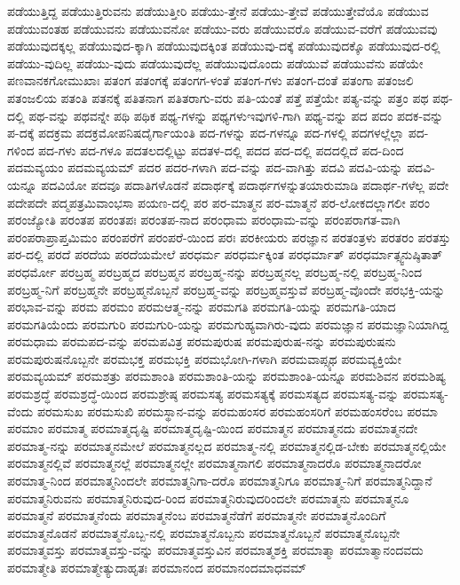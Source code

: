 {ಪಡೆಯುತ್ತಿದ್ದ
ಪಡೆಯುತ್ತಿರುವನು
ಪಡೆಯುತ್ತೀರಿ
ಪಡೆಯು-ತ್ತೇನೆ
ಪಡೆಯು-ತ್ತೇವೆ
ಪಡೆಯುತ್ತೇವೆಯೊ
ಪಡೆಯುವ
ಪಡೆಯುವಂತಹ
ಪಡೆಯುವನು
ಪಡೆಯುವನೋ
ಪಡೆಯು-ವರು
ಪಡೆಯುವರೊ
ಪಡೆಯುವ-ವರೆಗೆ
ಪಡೆಯುವವು
ಪಡೆಯುವುದಕ್ಕಲ್ಲ
ಪಡೆಯುವುದ-ಕ್ಕಾಗಿ
ಪಡೆಯುವುದಕ್ಕಿಂತ
ಪಡೆಯುವು-ದಕ್ಕೆ
ಪಡೆಯುವುದಕ್ಕೊ
ಪಡೆಯುವುದ-ರಲ್ಲಿ
ಪಡೆಯು-ವುದಿಲ್ಲ
ಪಡೆಯು-ವುದು
ಪಡೆಯುವುದೆಲ್ಲ
ಪಡೆಯುವುದೊಂದು
ಪಡೆಯುವೆ
ಪಡೆಯುವೆನು
ಪಡೆಯೇ
ಪಣವಾನಕಗೋಮುಖಾಃ
ಪತಂಗ
ಪತಂಗಕ್ಕೆ
ಪತಂಗಗ-ಳಂತೆ
ಪತಂಗ-ಗಳು
ಪತಂಗ-ದಂತೆ
ಪತಂಗಾ
ಪತಂಜಲಿ
ಪತಂಜಲಿಯ
ಪತಂತಿ
ಪತನಕ್ಕೆ
ಪತಿತನಾಗ
ಪತಿತರಾಗು-ವರು
ಪತಿ-ಯಂತೆ
ಪತ್ತೆ
ಪತ್ತೆಯೇ
ಪತ್ಯ-ವನ್ನು
ಪತ್ರಂ
ಪಥ
ಪಥ-ದಲ್ಲಿ
ಪಥ-ವನ್ನು
ಪಥವನ್ನೇ
ಪಥಿ
ಪಥಿಕ
ಪಥ್ಯ-ಗಳನ್ನು
ಪಥ್ಯಗಳುಇವುಗಳಿ-ಗಾಗಿ
ಪಥ್ಯ-ವನ್ನು
ಪದ
ಪದಂ
ಪದಕ-ವನ್ನು
ಪ-ದಕ್ಕೆ
ಪದಕ್ರಮ
ಪದಕ್ರಮೋಪನಿಷದೈರ್ಗಾಯಂತಿ
ಪದ-ಗಳನ್ನು
ಪದ-ಗಳನ್ನೂ
ಪದ-ಗಳಲ್ಲಿ
ಪದಗಳಲ್ಲೆಲ್ಲಾ
ಪದ-ಗಳಿಂದ
ಪದ-ಗಳು
ಪದ-ಗಳೂ
ಪದತಲದಲ್ಲಿಟ್ಟು
ಪದತಳ-ದಲ್ಲಿ
ಪದದ
ಪದ-ದಲ್ಲಿ
ಪದದಲ್ಲಿದೆ
ಪದ-ದಿಂದ
ಪದಮವ್ಯಯಂ
ಪದಮವ್ಯಯಮ್
ಪದರ
ಪದರ-ಗಳಾಗಿ
ಪದ-ವನ್ನು
ಪದ-ವಾಗಿತ್ತು
ಪದವಿ
ಪದವಿ-ಯನ್ನು
ಪದವಿ-ಯನ್ನೂ
ಪದವಿಯೋ
ಪದವೂ
ಪದಾತಿಗಳೊಡನೆ
ಪದಾರ್ಥಕ್ಕೆ
ಪದಾರ್ಥಗಳನ್ನುತಯಾರುಮಾಡಿ
ಪದಾರ್ಥ-ಗಳೆಲ್ಲ
ಪದೇ
ಪದೇಪದೇ
ಪದ್ಮಪತ್ರಮಿವಾಂಭಸಾ
ಪಯಣ-ದಲ್ಲಿ
ಪರ
ಪರ-ಮಾತ್ಮನ
ಪರ-ಮಾತ್ಮನೆ
ಪರ-ಲೋಕದಲ್ಲಾಗಲೀ
ಪರಂ
ಪರಂಜ್ಯೋತಿ
ಪರಂತಪ
ಪರಂತಪಃ
ಪರಂತಪ-ನಾದ
ಪರಂಧಾಮ
ಪರಂಧಾಮ-ವನ್ನು
ಪರಂಪರಾಗತ-ವಾಗಿ
ಪರಂಪರಾಪ್ರಾಪ್ತಮಿಮಂ
ಪರಂಪರೆಗೆ
ಪರಂಪರೆ-ಯಿಂದ
ಪರಃ
ಪರಕೀಯರು
ಪರಜ್ಞಾನ
ಪರತಂತ್ರಳು
ಪರತರಂ
ಪರತಸ್ತು
ಪರ-ದಲ್ಲಿ
ಪರದೆ
ಪರದೆಯ
ಪರದೆಯಮೇಲೆ
ಪರಧರ್ಮ
ಪರಧರ್ಮಕ್ಕಿಂತ
ಪರಧರ್ಮಾತ್
ಪರಧರ್ಮಾತ್ಸ್ವನುಷ್ಠಿತಾತ್
ಪರಧರ್ಮೋ
ಪರಬ್ರಹ್ಮ
ಪರಬ್ರಹ್ಮದ
ಪರಬ್ರಹ್ಮನ
ಪರಬ್ರಹ್ಮ-ನನ್ನು
ಪರಬ್ರಹ್ಮನಲ್ಲ
ಪರಬ್ರಹ್ಮ-ನಲ್ಲಿ
ಪರಬ್ರಹ್ಮ-ನಿಂದ
ಪರಬ್ರಹ್ಮ-ನಿಗೆ
ಪರಬ್ರಹ್ಮನೇ
ಪರಬ್ರಹ್ಮನೊಬ್ಬನೆ
ಪರಬ್ರಹ್ಮ-ವನ್ನು
ಪರಬ್ರಹ್ಮವಸ್ತುವೆ
ಪರಬ್ರಹ್ಮ-ವೊಂದೇ
ಪರಭಕ್ತಿ-ಯನ್ನು
ಪರಭಾವ-ವನ್ನು
ಪರಮ
ಪರಮಂ
ಪರಮಆತ್ಮ-ನನ್ನು
ಪರಮಗತಿ
ಪರಮಗತಿ-ಯನ್ನು
ಪರಮಗತಿ-ಯಾದ
ಪರಮಗತಿಯೆಂದು
ಪರಮಗುರಿ
ಪರಮಗುರಿ-ಯನ್ನು
ಪರಮಗುಹ್ಯವಾಗಿರು-ವುದು
ಪರಮಜ್ಞಾನ
ಪರಮಜ್ಞಾನಿಯಾಗಿದ್ದ
ಪರಮಧಾಮ
ಪರಮಪದ-ವನ್ನು
ಪರಮಪವಿತ್ರ
ಪರಮಪುರುಷ
ಪರಮಪುರುಷ-ನನ್ನು
ಪರಮಪುರುಷನು
ಪರಮಪುರುಷನೊಬ್ಬನೇ
ಪರಮಭಕ್ತ
ಪರಮಭಕ್ತಿ
ಪರಮಭೋಗಿ-ಗಳಾಗಿ
ಪರಮವಾಪ್ಸ್ಯಥ
ಪರಮವ್ಯಕ್ತಿಯೇ
ಪರಮವ್ಯಯಮ್
ಪರಮಶತ್ರು
ಪರಮಶಾಂತಿ
ಪರಮಶಾಂತಿ-ಯನ್ನು
ಪರಮಶಾಂತಿ-ಯನ್ನೂ
ಪರಮಶಿವನ
ಪರಮಶಿಷ್ಯ
ಪರಮಶ್ರದ್ಧೆ
ಪರಮಶ್ರದ್ಧೆ-ಯಿಂದ
ಪರಮಶ್ರೇಷ್ಠ
ಪರಮಸತ್ಯ
ಪರಮಸತ್ಯಕ್ಕೆ
ಪರಮಸತ್ಯದ
ಪರಮಸತ್ಯ-ವನ್ನು
ಪರಮಸತ್ಯ-ವೆಂದು
ಪರಮಸುಖ
ಪರಮಸುಖಿ
ಪರಮಸ್ಥಾನ-ವನ್ನು
ಪರಮಹಂಸರ
ಪರಮಹಂಸರಿಗೆ
ಪರಮಹಂಸರೆಂಬ
ಪರಮಾ
ಪರಮಾಂ
ಪರಮಾತ್ಮ
ಪರಮಾತ್ಮದೃಷ್ಟಿ
ಪರಮಾತ್ಮದೃಷ್ಟಿ-ಯಿಂದ
ಪರಮಾತ್ಮನ
ಪರಮಾತ್ಮನದು
ಪರಮಾತ್ಮನದೇ
ಪರಮಾತ್ಮ-ನನ್ನು
ಪರಮಾತ್ಮನಮೇಲೆ
ಪರಮಾತ್ಮನಲ್ಲದ
ಪರಮಾತ್ಮ-ನಲ್ಲಿ
ಪರಮಾತ್ಮನಲ್ಲಿಡ-ಬೇಕು
ಪರಮಾತ್ಮನಲ್ಲಿಯೇ
ಪರಮಾತ್ಮನಲ್ಲಿವೆ
ಪರಮಾತ್ಮನಲ್ಲೆ
ಪರಮಾತ್ಮನಲ್ಲೇ
ಪರಮಾತ್ಮನಾಗಲಿ
ಪರಮಾತ್ಮನಾದರೊ
ಪರಮಾತ್ಮನಾದರೋ
ಪರಮಾತ್ಮ-ನಿಂದ
ಪರಮಾತ್ಮನಿಂದಲೇ
ಪರಮಾತ್ಮನಿಗಾ-ದರೊ
ಪರಮಾತ್ಮನಿಗೂ
ಪರಮಾತ್ಮ-ನಿಗೆ
ಪರಮಾತ್ಮನಿದ್ದಾನೆ
ಪರಮಾತ್ಮನಿರುವನು
ಪರಮಾತ್ಮನಿರುವುದ-ರಿಂದ
ಪರಮಾತ್ಮನಿರುವುದರಿಂದಲೇ
ಪರಮಾತ್ಮನು
ಪರಮಾತ್ಮನೂ
ಪರಮಾತ್ಮನೆ
ಪರಮಾತ್ಮನೆಂದು
ಪರಮಾತ್ಮನೆಂಬ
ಪರಮಾತ್ಮನೆಡೆಗೆ
ಪರಮಾತ್ಮನೇ
ಪರಮಾತ್ಮನೊಂದಿಗೆ
ಪರಮಾತ್ಮನೊಡನೆ
ಪರಮಾತ್ಮನೊಬ್ಬ-ನಲ್ಲಿ
ಪರಮಾತ್ಮನೊಬ್ಬನು
ಪರಮಾತ್ಮನೊಬ್ಬನೆ
ಪರಮಾತ್ಮನೊಬ್ಬನೇ
ಪರಮಾತ್ಮವಸ್ತು
ಪರಮಾತ್ಮವಸ್ತು-ವನ್ನು
ಪರಮಾತ್ಮವಸ್ತುವಿನ
ಪರಮಾತ್ಮಶಕ್ತಿ
ಪರಮಾತ್ಮಾ
ಪರಮಾತ್ಮಾನಂದವದು
ಪರಮಾತ್ಮೇತಿ
ಪರಮಾತ್ಮೇತ್ಯುದಾಹೃತಃ
ಪರಮಾನಂದ
ಪರಮಾನಂದಮಾಧವಮ್
}
